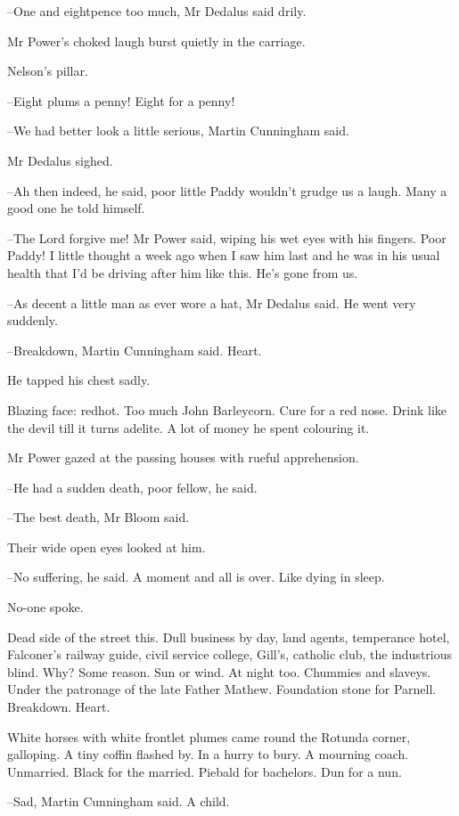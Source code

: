 --One and eightpence too much,
Mr Dedalus said drily.

Mr Power's choked laugh burst quietly in the carriage.

Nelson's pillar.

--Eight plums a penny!
Eight for a penny!

--We had better look a little serious,
Martin Cunningham said.

Mr Dedalus sighed.

--Ah then indeed,
he said,
poor little Paddy wouldn't grudge us a laugh.
Many a good one he told himself.

--The Lord forgive me!
Mr Power said,
wiping his wet eyes with his fingers.
Poor Paddy!
I little thought a week ago
when I saw him last
and he was in his usual health
that I'd be driving after him like this.
He's gone from us.

--As decent a little man as ever wore a hat,
Mr Dedalus said.
He went very suddenly.

--Breakdown,
Martin Cunningham said.
Heart.

He tapped his chest sadly.

Blazing face:
redhot.
Too much John Barleycorn.
Cure for a red nose.
Drink like the devil till it turns adelite.
A lot of money he spent colouring it.

Mr Power gazed at the passing houses with rueful apprehension.

--He had a sudden death, poor fellow,
he said.

--The best death,
Mr Bloom said.

Their wide open eyes looked at him.

--No suffering,
he said.
A moment and all is over.
Like dying in sleep.

No-one spoke.

Dead side of the street this.
Dull business by day,
land agents, temperance hotel,
Falconer's railway guide, civil service college,
Gill's, catholic club, the industrious blind.
Why?
Some reason.
Sun or wind.
At night too.
Chummies and slaveys.
Under the patronage of the late Father Mathew.
Foundation stone for Parnell.
Breakdown.
Heart.

White horses with white frontlet plumes came round the Rotunda corner,
galloping.
A tiny coffin flashed by.
In a hurry to bury.
A mourning coach.
Unmarried.
Black for the married.
Piebald for bachelors.
Dun for a nun.

--Sad,
Martin Cunningham said.
A child.

